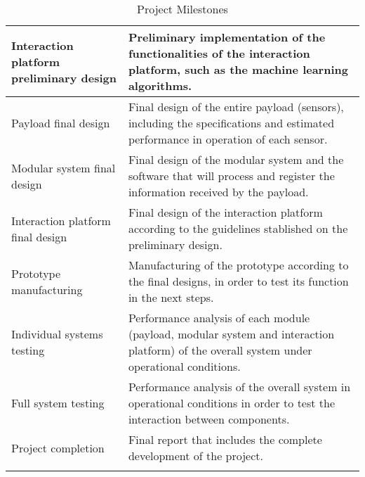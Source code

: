 \begin{longtable}[H]{>{\raggedright\arraybackslash}p{4cm} p{10cm}}
	\midrule
	
	Interaction platform preliminary design & Preliminary implementation of the functionalities of the interaction platform, such as the machine learning algorithms.\vspace{0.2cm} \\
	
	\midrule
	
	Payload final design & Final design of the entire payload (sensors), including the specifications and estimated performance in operation of each sensor.\vspace{0.2cm} \\
	
	\midrule
	
	Modular system final design & Final design of the modular system and the software that will process and register the information received by the payload.\vspace{0.2cm} \\
	
	\midrule
	
	Interaction platform final design & Final design of the interaction platform according to the guidelines stablished on the preliminary design.\vspace{0.2cm} \\
	
	\midrule
	
	Prototype manufacturing & Manufacturing of the prototype according to the final designs, in order to test its function in the next steps.\vspace{0.2cm} \\
	
	\midrule
	
	Individual systems testing & Performance analysis of each module (payload, modular system and interaction platform) of the overall system under operational conditions.\vspace{0.2cm} \\
	
	\midrule
	
	Full system testing & Performance analysis of the overall system in operational conditions in order to test the interaction between components.\vspace{0.2cm} \\
	
	\midrule
	
	Project completion & Final report that includes the complete development of the project.\vspace{0.2cm} \\
	
	\bottomrule[2pt]
	
	\caption{Project Milestones}
\end{longtable}